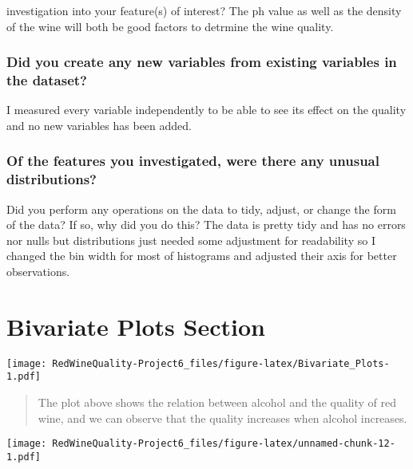 \documentclass[]{article}
\begin{document}
investigation into your feature(s) of interest? The ph value as well as
the density of the wine will both be good factors to detrmine the wine
quality.

\hypertarget{did-you-create-any-new-variables-from-existing-variables-in-the-dataset}{%
\subsubsection{Did you create any new variables from existing variables
in the
dataset?}\label{did-you-create-any-new-variables-from-existing-variables-in-the-dataset}}

I measured every variable independently to be able to see its effect on
the quality and no new variables has been added.

\hypertarget{of-the-features-you-investigated-were-there-any-unusual-distributions}{%
\subsubsection{\texorpdfstring{Of the features you investigated, were
there any unusual distributions?\\
}{Of the features you investigated, were there any unusual distributions? }}\label{of-the-features-you-investigated-were-there-any-unusual-distributions}}

Did you perform any operations on the data to tidy, adjust, or change
the form\\
of the data? If so, why did you do this? The data is pretty tidy and has
no errors nor nulls but distributions just needed some adjustment for
readability so I changed the bin width for most of histograms and
adjusted their axis for better observations.

\hypertarget{bivariate-plots-section}{%
\section{Bivariate Plots Section}\label{bivariate-plots-section}}

\texttt{[image: RedWineQuality-Project6\_files/figure-latex/Bivariate\_Plots-1.pdf]}

\begin{quote}
The plot above shows the relation between alcohol and the quality of red
wine, and we can observe that the quality increases when alcohol
increases.
\end{quote}

\texttt{[image: RedWineQuality-Project6\_files/figure-latex/unnamed-chunk-12-1.pdf]}
\end{document}
